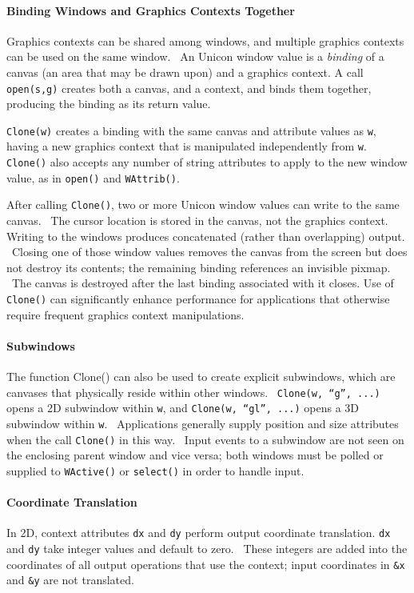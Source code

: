 \paragraph{Binding Windows and Graphics Contexts Together}
Graphics contexts can be shared among windows, and multiple graphics
contexts can be used on the same window. \ An Unicon window value is a
\textit{binding} of a canvas (an area that may be drawn upon) and a
graphics context. A call
\texttt{open(s,{\textquotedbl}g{\textquotedbl})} creates both a canvas,
and a context, and binds them together, producing the binding as its
return value.

\texttt{Clone(w)} creates a binding with the same canvas and attribute
values as \texttt{w}, having a new graphics context that is manipulated
independently from \texttt{w}. \texttt{Clone()} also accepts any number
of string attributes to apply to the new window value, as in
\texttt{open()} and \texttt{WAttrib()}.

After calling \texttt{Clone()}, two or more Unicon window values can
write to the same canvas. \ The cursor location is stored in the
canvas, not the graphics context. Writing to the windows produces
concatenated (rather than overlapping) output. \ Closing one of those
window values removes the canvas from the screen but does not destroy
its contents; the remaining binding references an invisible pixmap.
\ The canvas is destroyed after the last binding associated with it
closes. Use of \texttt{Clone()} can significantly enhance performance
for applications that otherwise require frequent graphics context
manipulations.

\paragraph{Subwindows}
The function Clone() can also be used to create explicit subwindows,
which are canvases that physically reside within other windows.
\ \texttt{Clone(w, {\textquotedblleft}g{\textquotedblright}, ...)}
opens a 2D subwindow within \texttt{w}, and \texttt{Clone(w,
{\textquotedblleft}gl{\textquotedblright}, ...)} opens a 3D subwindow
within \texttt{w}. \ Applications generally supply position and size
attributes when the call \texttt{Clone()} in this way. \ Input events
to a subwindow are not seen on the enclosing parent window and vice
versa; both windows must be polled or supplied to \texttt{WActive()} or
\texttt{select()} in order to handle input.

\paragraph{Coordinate Translation}
In 2D, context attributes \texttt{dx} and \texttt{dy} perform output
coordinate translation. \texttt{dx} and \texttt{dy} take integer values
and default to zero. \ These integers are added into the coordinates of
all output operations that use the context; input coordinates in
\texttt{\&x} and \texttt{\&y} are not translated.

